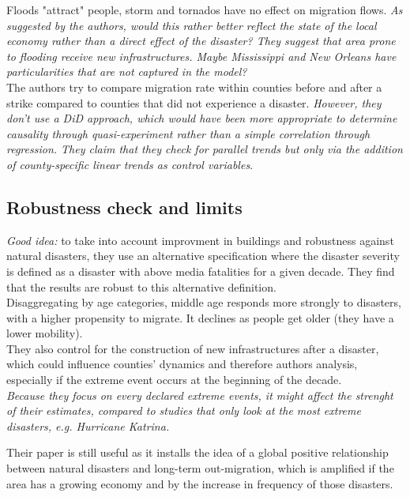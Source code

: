 \documentclass[11pt, oneside]{article}   	%
\begin{document}
Floods "attract" people, storm and tornados have no effect on migration flows. \textit{As suggested by the authors, would this rather better reflect the state of the local economy rather than a direct effect of the disaster? They suggest that area prone to flooding receive new infrastructures. Maybe Mississippi and New Orleans have particularities that are not captured in the model?} \\

The authors try to compare migration rate within counties before and after a strike compared to counties that did not experience a disaster. \textit{However, they don't use a DiD approach, which would have been more appropriate to determine causality through quasi-experiment rather than a simple correlation through regression. They claim that they check for parallel trends but only via the addition of county-specific linear trends as control variables}. \\ 


\subsection{Robustness check and limits}
\textit{Good idea:} to take into account improvment in buildings and robustness against natural disasters, they use an alternative specification where the disaster severity is defined as a disaster with above media fatalities for a given decade. They find that the results are robust to this alternative definition. \\

Disaggregating by age categories, middle age responds more strongly to disasters, with a higher propensity to migrate. It declines as people get older (they have a lower mobility). \\

They also control for the construction of new infrastructures after a disaster, which could influence counties' dynamics and therefore authors analysis, especially if the extreme event occurs at the beginning of the decade. \\

\textit{Because they focus on every declared extreme events, it might affect the strenght of their estimates, compared to studies that only look at the most extreme disasters, e.g. Hurricane Katrina.}

Their paper is still useful as it installs the idea of a global positive relationship between natural disasters and long-term out-migration, which is amplified if the area has a growing economy and by the increase in frequency of those disasters.
\end{document}
